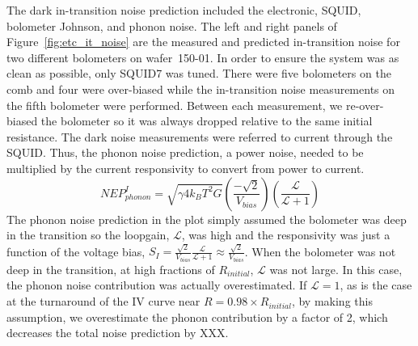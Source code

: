 The dark in-transition noise prediction included the electronic, \ac{SQUID}, bolometer Johnson, and phonon noise. 
The left and right panels of Figure~\ref{fig:etc_it_noise} are the measured and predicted in-transition noise for two different bolometers on wafer~150-01. 
In order to ensure the system was as clean as possible, only \ac{SQUID}7 was tuned. 
There were five bolometers on the comb and four were over-biased while the in-transition noise measurements on the fifth bolometer were performed. 
Between each measurement, we re-over-biased the bolometer so it was always dropped relative to the same initial resistance. 
The dark noise measurements were referred to current through the \ac{SQUID}. 
Thus, the phonon noise prediction, a power noise, needed to be multiplied by the current responsivity to convert from power to current. 
\begin{equation}
NEP_{phonon}^{I} = \sqrt{\gamma 4 k_{B} T^2 G} \left( \frac{-\sqrt{2}}{V_{bias}} \right) \left( \frac{\mathscr{L}}{\mathscr{L}+1} \right)
\end{equation}
The phonon noise prediction in the plot simply assumed the bolometer was deep in the transition so the loopgain, $\mathscr{L}$, was high and the responsivity was just a function of the voltage bias, $S_{I} = \frac{\sqrt{2}}{V_{bias}} \frac{\mathscr{L}}{\mathscr{L}+1} \approx \frac{\sqrt{2}}{V_{bias}} $. 
When the bolometer was not deep in the transition, at high fractions of $R_{initial}$, $\mathscr{L}$ was not large.
In this case, the phonon noise contribution was actually overestimated. 
If $\mathscr{L} = 1$, as is the case at the turnaround of the IV curve near $R = 0.98 \times R_{initial}$, by making this assumption, we overestimate the phonon contribution by a factor of 2, which decreases the total noise prediction by XXX. 
 

